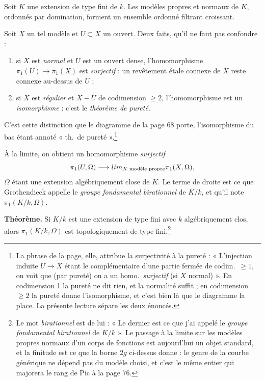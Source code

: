 \documentclass[11pt,a4paper]{article}
\begin{document}
Soit $K$ une extension de type fini de $k$. Les modèles propres et normaux de
$K$, ordonnés par domination, forment un ensemble ordonné filtrant croissant.

Soit $X$ un tel modèle et $U \subset X$ un ouvert. Deux faits, qu'il ne faut
pas confondre :

\begin{enumerate}
  \item si $X$ est \emph{normal} et $U$ est un ouvert dense, l'homomorphisme
    $\pi_{1}(U) \to \pi_{1}(X)$ est \emph{surjectif} : un revêtement étale
    connexe de $X$ reste connexe au-dessus de $U$ ;
  \item si $X$ est \emph{régulier} et $X - U$ de codimension $\geqslant 2$,
    l'homomorphisme est un \emph{isomorphisme} : c'est le \emph{théorème de
    pureté}.
\end{enumerate}

C'est cette distinction que le diagramme de la page 68 porte, l'isomorphisme du
bas étant annoté « th.\ de pureté ».\footnote{La phrase de la page, elle,
attribue la surjectivité à la pureté : « L'injection induite $U \to X$ étant le
complémentaire d'une partie fermée de codim.\ $\geqslant 1$, on voit que (par
pureté) on a un homo.\ \emph{surjectif} (si $X$ normal) ». En codimension 1 la
pureté ne dit rien, et la normalité suffit ; en codimension $\geqslant 2$ la
pureté donne l'isomorphisme, et c'est bien là que le diagramme la place. La
présente lecture sépare les deux énoncés.}


À la limite, on obtient un homomorphisme \emph{surjectif}
\[
  \pi_{1}(U, \Omega) \longrightarrow
  \varprojlim_{X \text{ modèle propre}} \pi_{1}(X, \Omega) ,
\]
$\Omega$ étant une extension algébriquement close de $K$. Le terme de droite est
ce que Grothendieck appelle le \emph{groupe fondamental birationnel} de $K/k$,
et qu'il note $\pi_{1}(K/k, \Omega)$.

\textbf{Théorème.} Si $K/k$ est une extension de type fini avec $k$
algébriquement clos, alors $\pi_{1}(K/k, \Omega)$ est topologiquement de type
fini.\footnote{Le mot \emph{birationnel} est de lui : « Le dernier est ce que
j'ai appelé le \emph{groupe fondamental birationnel} de $K/k$ ». Le passage à
la limite sur les modèles propres normaux d'un corps de fonctions est
aujourd'hui un objet standard, et la finitude est ce que la borne $2g$ ci-dessus
donne : le genre de la courbe générique ne dépend pas du modèle choisi, et
c'est le même entier qui majorera le rang de $\mathrm{Pic}$ à la page 76.}
\end{document}
